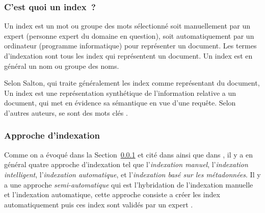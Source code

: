 \subsubsection{C'est quoi un index~?}\label{sec:index}
Un index est un mot ou groupe des mots sélectionné soit manuellement par un expert (personne expert du domaine en question), soit automatiquement par un ordinateur (programme informatique) pour représenter un document. Les termes d'indexation sont tous les index qui représentent un document. Un index est en général un nom ou groupe des noms.

Selon Salton, qui traite généralement les index comme représentant du document, Un index est une représentation synthétique de l'information relative a un document, qui met en évidence sa sémantique en vue d'une requête. Selon d'autres auteurs, se sont des mots clés \citep{paradis:tel-00005009}.

\subsubsection{Approche d'indexation}
Comme on a évoqué dans la Section~\ref{sec:index} et cité dans \citep{ir-on-web} ainsi que dans \citep{amelioration-ri-approche-semantique}, il y a en général quatre approche d'indexation tel que l'\textit{indexation manuel}, l'\textit{indexation intelligent}, l’\textit{indexation automatique}, et l'\textit{indexation basé sur les métadonnées}. Il y a une approche \textit{semi-automatique} qui est l'hybridation de l'indexation manuelle et l'indexation automatique, cette approche consiste a créer les index automatiquement puis ces index sont validés par un expert \citep{paradis:tel-00005009}.

